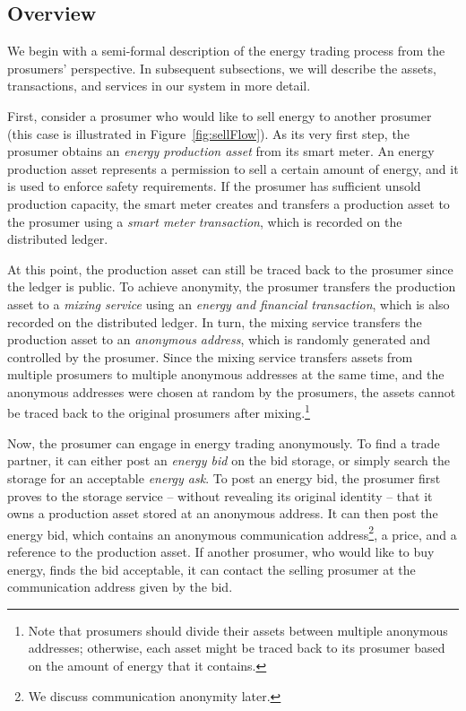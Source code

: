 \subsection{Overview}
We begin with a semi-formal description of the energy trading process from the prosumers' perspective.
In subsequent subsections, we will describe the assets, transactions, and services in our system in more detail.

First, consider a prosumer who would like to sell energy to another prosumer (this case is illustrated in Figure~\ref{fig:sellFlow}).
As its very first step, the prosumer obtains an \emph{energy production asset} from its smart meter.
An energy production asset represents a permission to sell a certain amount of energy, and it is used to enforce safety requirements.
If the prosumer has sufficient unsold production capacity, the smart meter creates and transfers a production asset to the prosumer using a \emph{smart meter transaction}, which is recorded on the distributed ledger.

At this point, the production asset can still be traced back to the prosumer since the ledger is public.
To achieve anonymity, the prosumer transfers the production asset to a \emph{mixing service} using an \emph{energy and financial transaction}, which is also recorded on the distributed ledger.
In turn, the mixing service transfers the production asset to an \emph{anonymous address}, which is randomly generated and controlled by the prosumer.
Since the mixing service transfers assets from multiple prosumers to multiple anonymous addresses at the same time, and the anonymous addresses were chosen at random by the prosumers, the assets cannot be traced back to the original prosumers after mixing.\footnote{Note that prosumers should divide their assets between multiple anonymous addresses; otherwise, each asset might be traced back to its prosumer based on the amount of energy that it contains.}

Now, the prosumer can engage in energy trading anonymously.
To find a trade partner, it can either post an \emph{energy bid} on the bid storage, or simply search the storage for an acceptable \emph{energy ask}.
To post an energy bid, the prosumer first proves to the storage service -- without revealing its original identity -- that it owns a production asset stored at an anonymous address.
It can then post the energy bid, which contains an anonymous communication address\footnote{We discuss communication anonymity later.}, a price, and a reference to the production asset.
If another prosumer, who would like to buy energy, finds the bid acceptable, it can contact the selling prosumer at the communication address given by the bid.



